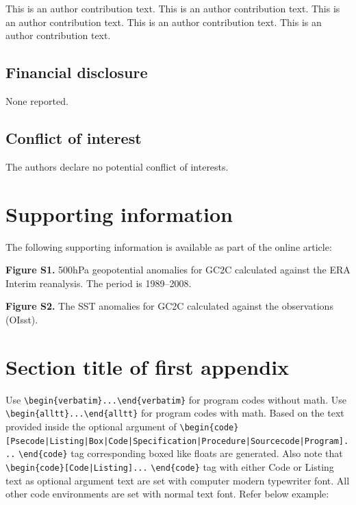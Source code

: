 \documentclass[APA,LATO1COL]{WileyNJD-v2}
\begin{document}
This is an author contribution text. This is an author contribution text. This is an author contribution text. This is an author contribution text. This is an author contribution text. 

\subsection*{Financial disclosure}

None reported.

\subsection*{Conflict of interest}

The authors declare no potential conflict of interests.


\section*{Supporting information}

The following supporting information is available as part of the online article:

\noindent
\textbf{Figure S1.}
{500{\uns}hPa geopotential anomalies for GC2C calculated against the ERA Interim reanalysis. The period is 1989--2008.}

\noindent
\textbf{Figure S2.}
{The SST anomalies for GC2C calculated against the observations (OIsst).}


\appendix

\section{Section title of first appendix\label{app1}}

Use \verb+\begin{verbatim}...\end{verbatim}+ for program codes without math. Use \verb+\begin{alltt}...\end{alltt}+ for program codes with math. Based on the text provided inside the optional argument of \verb+\begin{code}[Psecode|Listing|Box|Code|+\hfill\break \verb+Specification|Procedure|Sourcecode|Program]...+ \verb+\end{code}+ tag corresponding boxed like floats are generated. Also note that \verb+\begin{code}[Code|Listing]...+ \verb+\end{code}+ tag with either Code or Listing text as optional argument text are set with computer modern typewriter font.  All other code environments are set with normal text font. Refer below example:
\end{document}
